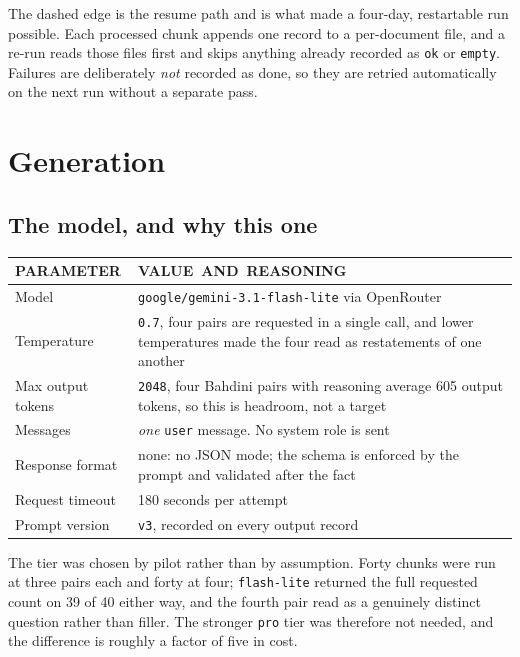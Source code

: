 \documentclass[10pt,a4paper]{article}
\newcommand{\codeid}[1]{\texttt{\footnotesize\color{inksoft}#1}}
\newcommand{\tablehead}[1]{{\uimed\fontsize{6.8}{8}\selectfont\color{crail}\mbox{#1}}}
\begin{document}
\vspace{-2mm}
The dashed edge is the resume path and is what made a four-day, restartable run
possible. Each processed chunk appends one record to a per-document file, and a
re-run reads those files first and skips anything already recorded as
\codeid{ok} or \codeid{empty}. Failures are deliberately \emph{not} recorded as
done, so they are retried automatically on the next run without a separate
pass.

\section{Generation}

\subsection{The model, and why this one}

\begin{tabularx}{\textwidth}{@{}p{4.2cm}L@{}}
\tablehead{PARAMETER} & \tablehead{VALUE AND REASONING}\\
\midrule
Model & \codeid{google/gemini-3.1-flash-lite} via OpenRouter\\
Temperature & \codeid{0.7}, four pairs are requested in a single call, and
lower temperatures made the four read as restatements of one another\\
Max output tokens & \codeid{2048}, four Bahdini pairs with reasoning
average 605 output tokens, so this is headroom, not a target\\
Messages & \emph{one} \codeid{user} message. No system role is sent\\
Response format & none: no JSON mode; the schema is enforced by the prompt
and validated after the fact\\
Request timeout & 180 seconds per attempt\\
Prompt version & \codeid{v3}, recorded on every output record\\
\bottomrule
\end{tabularx}

\vspace{0.6em}
The tier was chosen by pilot rather than by assumption. Forty chunks were run
at three pairs each and forty at four; \codeid{flash-lite} returned the full
requested count on 39 of 40 either way, and the fourth pair read as a genuinely
distinct question rather than filler. The stronger \codeid{pro} tier was
therefore not needed, and the difference is roughly a factor of five in cost.
\end{document}
